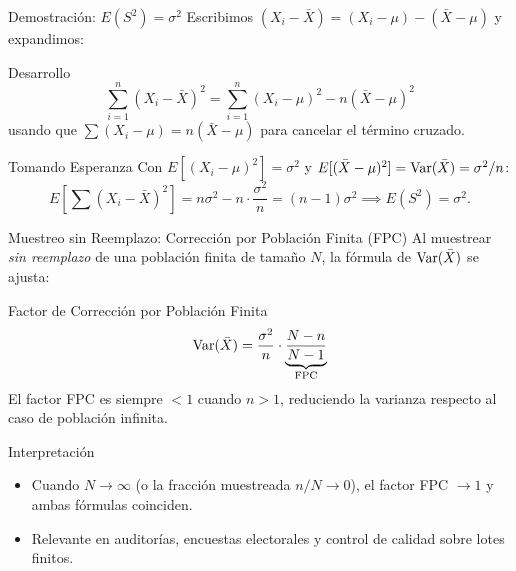 \documentclass[10pt, aspectratio=169]{beamer}
\begin{document}
\begin{frame}{Demostración: $E(S^2) = \sigma^2$}
  \footnotesize
  Escribimos $(X_i-\bar{X}) = (X_i-\mu) - (\bar{X}-\mu)$ y expandimos: \pause

  \vspace{0.1cm}
  \begin{block}{Desarrollo}
    $$\sum_{i=1}^n (X_i-\bar{X})^2 = \sum_{i=1}^n (X_i-\mu)^2 - n(\bar{X}-\mu)^2$$
    usando que $\sum(X_i-\mu) = n(\bar{X}-\mu)$ para cancelar el término cruzado.
  \end{block}

  \vspace{0.1cm}
  \pause
  \begin{alertblock}{Tomando Esperanza}
    Con $E[(X_i-\mu)^2]=\sigma^2$ y $E[(\bar{X}-\mu)^2]=\operatorname{Var}(\bar{X})=\sigma^2/n$:
    $$E\left[\sum(X_i-\bar{X})^2\right] = n\sigma^2 - n\cdot\frac{\sigma^2}{n} = (n-1)\sigma^2 \implies E(S^2)=\sigma^2.$$
  \end{alertblock}
\end{frame}

\begin{frame}{Muestreo sin Reemplazo: Corrección por Población Finita (FPC)}
  \footnotesize
  Al muestrear \emph{sin reemplazo} de una población finita de tamaño $N$, la fórmula de $\operatorname{Var}(\bar{X})$ se ajusta: \pause

  \vspace{0.1cm}
  \begin{block}{Factor de Corrección por Población Finita}
    $$\operatorname{Var}(\bar{X}) = \dfrac{\sigma^2}{n}\cdot\underbrace{\dfrac{N-n}{N-1}}_{\text{FPC}}$$
    El factor FPC es siempre $< 1$ cuando $n>1$, reduciendo la varianza respecto al caso de población infinita.
  \end{block}

  \vspace{0.1cm}
  \pause
  \begin{alertblock}{Interpretación}
    \begin{itemize}\itemsep=0.05cm
      \item Cuando $N\to\infty$ (o la fracción muestreada $n/N \to 0$), el factor FPC $\to 1$ y ambas fórmulas coinciden.
      \item Relevante en auditorías, encuestas electorales y control de calidad sobre lotes finitos.
    \end{itemize}
  \end{alertblock}
\end{frame}
\end{document}
